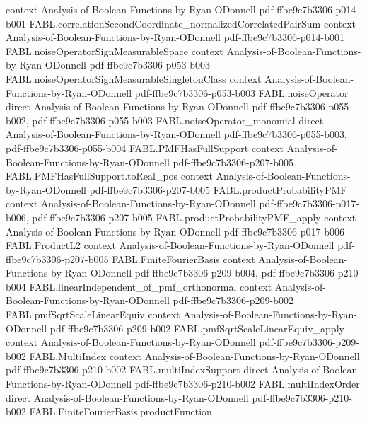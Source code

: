 \begin{theorem}
  {context}
  {Analysis-of-Boolean-Functions-by-Ryan-ODonnell}
  {pdf-ffbe9c7b3306-p014-b001}
\proofstep
  {FABL.correlationSecondCoordinate_normalizedCorrelatedPairSum}
  {context}
  {Analysis-of-Boolean-Functions-by-Ryan-ODonnell}
  {pdf-ffbe9c7b3306-p014-b001}
\proofstep
  {FABL.noiseOperatorSignMeasurableSpace}
  {context}
  {Analysis-of-Boolean-Functions-by-Ryan-ODonnell}
  {pdf-ffbe9c7b3306-p053-b003}
\proofstep
  {FABL.noiseOperatorSignMeasurableSingletonClass}
  {context}
  {Analysis-of-Boolean-Functions-by-Ryan-ODonnell}
  {pdf-ffbe9c7b3306-p053-b003}
\proofstep
  {FABL.noiseOperator}
  {direct}
  {Analysis-of-Boolean-Functions-by-Ryan-ODonnell}
  {pdf-ffbe9c7b3306-p055-b002,
    pdf-ffbe9c7b3306-p055-b003}
\proofstep
  {FABL.noiseOperator_monomial}
  {direct}
  {Analysis-of-Boolean-Functions-by-Ryan-ODonnell}
  {pdf-ffbe9c7b3306-p055-b003,
    pdf-ffbe9c7b3306-p055-b004}
\proofstep
  {FABL.PMFHasFullSupport}
  {context}
  {Analysis-of-Boolean-Functions-by-Ryan-ODonnell}
  {pdf-ffbe9c7b3306-p207-b005}
\proofstep
  {FABL.PMFHasFullSupport.toReal_pos}
  {context}
  {Analysis-of-Boolean-Functions-by-Ryan-ODonnell}
  {pdf-ffbe9c7b3306-p207-b005}
\proofstep
  {FABL.productProbabilityPMF}
  {context}
  {Analysis-of-Boolean-Functions-by-Ryan-ODonnell}
  {pdf-ffbe9c7b3306-p017-b006,
    pdf-ffbe9c7b3306-p207-b005}
\proofstep
  {FABL.productProbabilityPMF_apply}
  {context}
  {Analysis-of-Boolean-Functions-by-Ryan-ODonnell}
  {pdf-ffbe9c7b3306-p017-b006}
\proofstep
  {FABL.ProductL2}
  {context}
  {Analysis-of-Boolean-Functions-by-Ryan-ODonnell}
  {pdf-ffbe9c7b3306-p207-b005}
\proofstep
  {FABL.FiniteFourierBasis}
  {context}
  {Analysis-of-Boolean-Functions-by-Ryan-ODonnell}
  {pdf-ffbe9c7b3306-p209-b004,
    pdf-ffbe9c7b3306-p210-b004}
\proofstep
  {FABL.linearIndependent_of_pmf_orthonormal}
  {context}
  {Analysis-of-Boolean-Functions-by-Ryan-ODonnell}
  {pdf-ffbe9c7b3306-p209-b002}
\proofstep
  {FABL.pmfSqrtScaleLinearEquiv}
  {context}
  {Analysis-of-Boolean-Functions-by-Ryan-ODonnell}
  {pdf-ffbe9c7b3306-p209-b002}
\proofstep
  {FABL.pmfSqrtScaleLinearEquiv_apply}
  {context}
  {Analysis-of-Boolean-Functions-by-Ryan-ODonnell}
  {pdf-ffbe9c7b3306-p209-b002}
\proofstep
  {FABL.MultiIndex}
  {context}
  {Analysis-of-Boolean-Functions-by-Ryan-ODonnell}
  {pdf-ffbe9c7b3306-p210-b002}
\proofstep
  {FABL.multiIndexSupport}
  {direct}
  {Analysis-of-Boolean-Functions-by-Ryan-ODonnell}
  {pdf-ffbe9c7b3306-p210-b002}
\proofstep
  {FABL.multiIndexOrder}
  {direct}
  {Analysis-of-Boolean-Functions-by-Ryan-ODonnell}
  {pdf-ffbe9c7b3306-p210-b002}
\proofstep
  {FABL.FiniteFourierBasis.productFunction}

\end{theorem}
